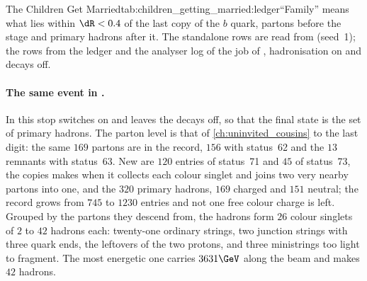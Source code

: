 \begin{ledgerboth}{The Children Get Married}{tab:children_getting_married:ledger}{``Family''
means what lies within $\dR<0.4$ of the last copy of the $b$ quark,
partons before the stage and primary hadrons after it. The standalone rows
are read from  (seed~1); the \CMSSW rows
from the ledger and the analyser log of the  job of
, hadronisation on and decays off.}
\end{ledgerboth}

\paragraph{The same event in \CMSSW.} In \CMSSW this stop switches on
 and leaves the decays off, so that the final
state is the set of primary hadrons. The parton level is that of
\cref{ch:uninvited_cousins} to the last digit: the same $169$ partons are
in the record, $156$ with status~62 and the $13$ remnants with status~63.
New are $120$ entries of status~71 and $45$ of status~73, the copies
\PYTHIA makes when it collects each colour singlet and joins two very
nearby partons into one, and the $320$ primary hadrons, $169$ charged and
$151$ neutral; the record grows from $745$ to $1230$ entries and not one
free colour charge is left. Grouped by the partons they descend from, the
hadrons form $26$ colour singlets of $2$ to $42$ hadrons each:
twenty-one ordinary strings, two junction strings with three quark ends,
the leftovers of the two protons, and three ministrings too light to
fragment. The most energetic one carries $3631\GeV$ along the beam and
makes $42$ hadrons.

